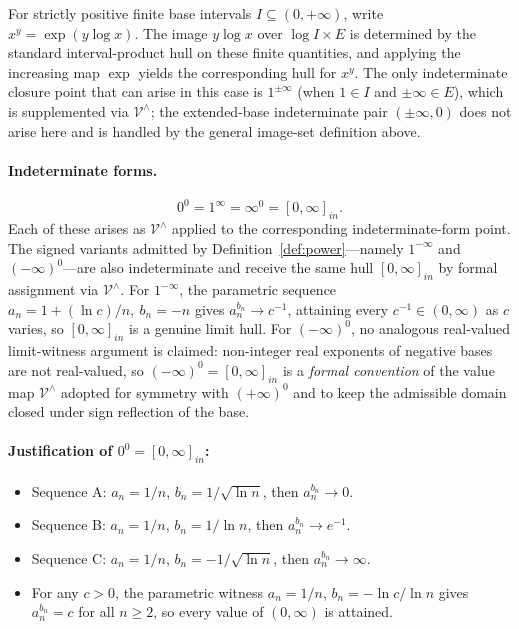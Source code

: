 \documentclass[11pt,a4paper]{article}
\theoremstyle{paperdef}
\newcommand{\inI}[1]{[#1]_{in}}
\newcommand{\Vhat}{\mathcal{V}^{\wedge}}
\begin{document}
For strictly positive finite base intervals $I \subseteq (0, +\infty)$,
write $x^{y} = \exp(y \log x)$. The image $y \log x$ over
$\log I \times E$ is determined by the standard interval-product hull
on these finite quantities, and applying the increasing map $\exp$
yields the corresponding hull for $x^{y}$. The only indeterminate
closure point that can arise in this case is $1^{\pm\infty}$ (when
$1 \in I$ and $\pm\infty \in E$), which is supplemented via $\Vhat$;
the extended-base indeterminate pair $(\pm\infty, 0)$ does not
arise here and is handled by the general image-set definition above.

\paragraph{Indeterminate forms.}
\[
0^{0} = 1^{\infty} = \infty^{0} = \inI{0, \infty}.
\]
Each of these arises as $\Vhat$ applied to the corresponding
indeterminate-form point. The signed variants admitted by
Definition~\ref{def:power}---namely $1^{-\infty}$ and
$(-\infty)^{0}$---are also indeterminate and receive the same hull
$\inI{0, \infty}$ by formal assignment via $\Vhat$. For
$1^{-\infty}$, the parametric sequence
$a_n = 1 + (\ln c)/n,\ b_n = -n$ gives $a_n^{b_n} \to c^{-1}$,
attaining every $c^{-1} \in (0, \infty)$ as $c$ varies, so
$\inI{0, \infty}$ is a genuine limit hull. For $(-\infty)^{0}$, no
analogous real-valued limit-witness argument is claimed: non-integer
real exponents of negative bases are not real-valued, so
$(-\infty)^{0} = \inI{0, \infty}$ is a \emph{formal convention} of
the value map $\Vhat$ adopted for symmetry with $(+\infty)^{0}$ and
to keep the admissible domain closed under sign reflection of the
base.

\paragraph{Justification of $0^{0} = \inI{0, \infty}$:}
\begin{itemize}[leftmargin=2em]
  \item Sequence A: $a_n = 1/n$, $b_n = 1/\sqrt{\ln n}$, then
    $a_n^{b_n} \to 0$.
  \item Sequence B: $a_n = 1/n$, $b_n = 1/\ln n$, then
    $a_n^{b_n} \to e^{-1}$.
  \item Sequence C: $a_n = 1/n$, $b_n = -1/\sqrt{\ln n}$, then
    $a_n^{b_n} \to \infty$.
  \item For any $c > 0$, the parametric witness $a_n = 1/n$,
    $b_n = -\ln c / \ln n$ gives $a_n^{b_n} = c$ for all $n \ge 2$,
    so every value of $(0, \infty)$ is attained.
\end{itemize}
\end{document}
